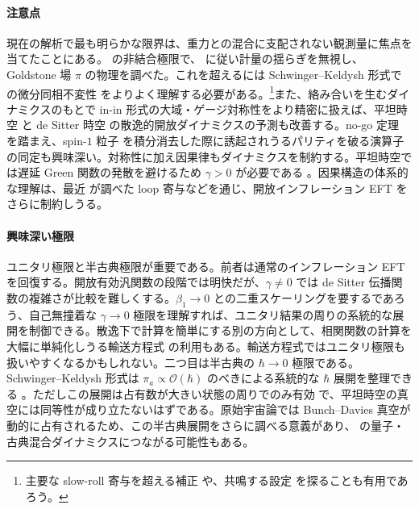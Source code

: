\documentclass[a4paper,11pt]{ltjsarticle}
\numberwithin{equation}{section}
\def\pia{\pi_{a}}
\begin{document}
\paragraph{注意点} 現在の解析で最も明らかな限界は、重力との混合に支配されない観測量に焦点を当てたことにある。\cite{Cheung:2007st} の非結合極限で、\cite{LopezNacir:2011kk} に従い計量の揺らぎを無視し、Goldstone 場 $\pi$ の物理を調べた。これを超えるには Schwinger--Keldysh 形式での微分同相不変性 \cite{Akyuz:2023lsm} をよりよく理解する必要がある。\footnote{主要な slow-roll 寄与を超える補正 \cite{Green:2024hbw} や、共鳴する設定 \cite{Flauger:2009ab,Flauger:2010ja,Behbahani:2011it,DuasoPueyo:2023kyh} を探ることも有用であろう。}また、絡み合いを生むダイナミクスのもとで in-in 形式の大域・ゲージ対称性をより精密に扱えば、平坦時空 \cite{Matsumura:2023cni, Kashiwagi:2023zwj} と de Sitter 時空 \cite{Lotkov:2023vqt} の散逸的開放ダイナミクスの予測も改善する。no-go 定理 \cite{Liu:2019fag,Cabass:2022rhr} を踏まえ、spin-$1$ 粒子 \cite{Anber:2009ua, Peloso:2022ovc} を積分消去した際に誘起されうるパリティを破る演算子の同定も興味深い。対称性に加え因果律もダイナミクスを制約する。平坦時空では遅延 Green 関数の発散を避けるため $\gamma>0$ が必要である \cite{kamenev_2011}。因果構造の体系的な理解は、最近 \cite{Agui-Salcedo:2023wlq} が調べた loop 寄与などを通じ、開放インフレーション EFT をさらに制約しうる。

\paragraph{興味深い極限} ユニタリ極限と半古典極限が重要である。前者は通常のインフレーション EFT \cite{Cheung:2007st} を回復する。開放有効汎関数の段階では明快だが、$\gamma\neq0$ では de Sitter 伝播関数の複雑さが比較を難しくする。$\beta_1\rightarrow0$ との二重スケーリングを要するであろう、自己無撞着な $\gamma\rightarrow0$ 極限を理解すれば、ユニタリ結果の周りの系統的な展開を制御できる。散逸下で計算を簡単にする別の方向として、相関関数の計算を大幅に単純化しうる輸送方程式 \cite{Dias:2016rjq, Ronayne:2017qzn, Werth:2023pfl, Pinol:2023oux, Werth:2024aui} の利用もある。輸送方程式ではユニタリ極限も扱いやすくなるかもしれない。二つ目は半古典の $\hbar\rightarrow0$ 極限である。Schwinger--Keldysh 形式は $\pia\propto\mathcal{O}(\hbar)$ のべきによる系統的な $\hbar$ 展開を整理できる \cite{Kamenev:2009jj}。ただしこの展開は占有数が大きい状態の周りでのみ有効 \cite{Radovskaya:2020lns} で、平坦時空の真空には同等性が成り立たないはずである。原始宇宙論では Bunch--Davies 真空が動的に占有されるため、この半古典展開をさらに調べる意義があり、\cite{Oppenheim:2020wdj, Oppenheim:2022xjr, Oppenheim:2022xjc, Oppenheim:2023izn, Layton:2023wdo, Oppenheim:2024iae, grudka2024renormalisation} の量子・古典混合ダイナミクスにつながる可能性もある。
\end{document}
